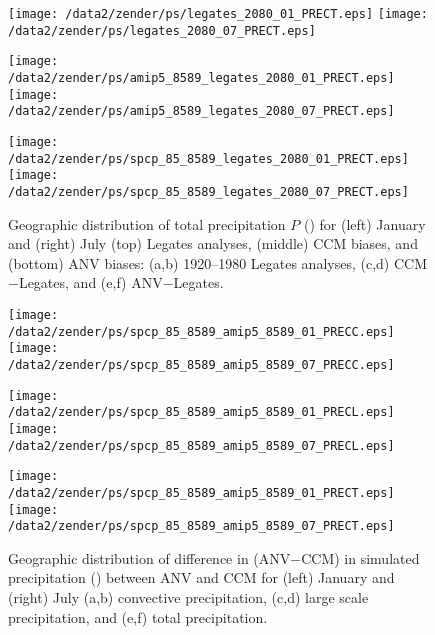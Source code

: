 \documentclass[twocolumn,final]{article}
\begin{document}
\begin{figure*}
\begin{center}
\texttt{[image: /data2/zender/ps/legates\_2080\_01\_PRECT.eps]}%
\texttt{[image: /data2/zender/ps/legates\_2080\_07\_PRECT.eps]}%

\texttt{[image: /data2/zender/ps/amip5\_8589\_legates\_2080\_01\_PRECT.eps]}%
\texttt{[image: /data2/zender/ps/amip5\_8589\_legates\_2080\_07\_PRECT.eps]}%

\texttt{[image: /data2/zender/ps/spcp\_85\_8589\_legates\_2080\_01\_PRECT.eps]}%
\texttt{[image: /data2/zender/ps/spcp\_85\_8589\_legates\_2080\_07\_PRECT.eps]}%
\end{center}
\caption[Geographic distribution of total precipitation $P$ 
for January and July Legates analyses, CCM biases, and ANV biases]{  
Geographic distribution of total precipitation $P$ (\mmxday)
for (left) January and (right) July (top) Legates analyses, 
(middle) CCM biases, and (bottom) ANV biases: (a,b) 1920--1980 Legates
analyses, (c,d) CCM$-$Legates, and (e,f) ANV$-$Legates.   
\label{fig:8589_PRECT}}   
\end{figure*}
\clearpage

\begin{figure*}
\begin{center}
\texttt{[image: /data2/zender/ps/spcp\_85\_8589\_amip5\_8589\_01\_PRECC.eps]}%
\texttt{[image: /data2/zender/ps/spcp\_85\_8589\_amip5\_8589\_07\_PRECC.eps]}%

\texttt{[image: /data2/zender/ps/spcp\_85\_8589\_amip5\_8589\_01\_PRECL.eps]}%
\texttt{[image: /data2/zender/ps/spcp\_85\_8589\_amip5\_8589\_07\_PRECL.eps]}%

\texttt{[image: /data2/zender/ps/spcp\_85\_8589\_amip5\_8589\_01\_PRECT.eps]}%
\texttt{[image: /data2/zender/ps/spcp\_85\_8589\_amip5\_8589\_07\_PRECT.eps]}%
\end{center}
\caption[Geographic distribution of difference (ANV$-$CCM) in
simulated precipitation between ANV and CCM for January and
July 1985--1989]{   
Geographic distribution of difference in (ANV$-$CCM) in simulated
precipitation (\mmxday) between ANV and CCM for (left) January and
(right) July (a,b) convective precipitation, (c,d) large scale
precipitation, and (e,f) total precipitation.
\label{fig:spcp_85_8589_amip5_8589_PREC}}   
\end{figure*}
\clearpage
\end{document}
